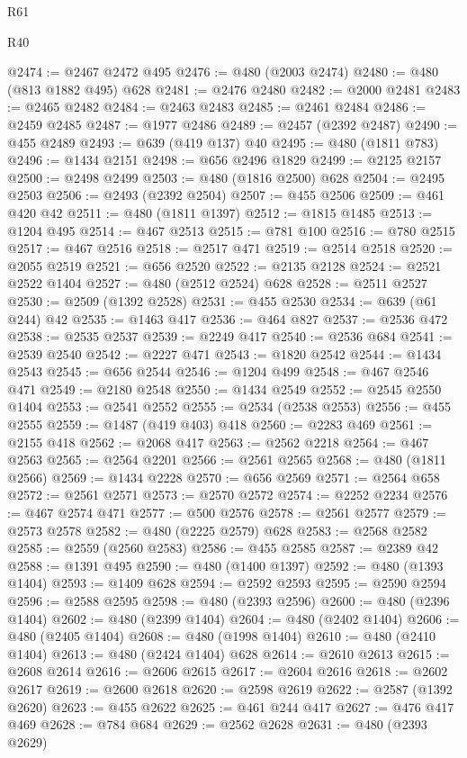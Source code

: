 \begin{lexlean}{R61}
\begin{lexlean}{R40}
\begin{coremodule}
{{{{{{{{{{{{{{{{{{{{{{{{{{{{{{{{{{{{{{{{{{{{{{{{{{{{{{{{{{{{{{{{{{{{{{{{{{{{{{{{{{{{{{{{{{{{{{{{{{{{{{{{{{{{{@2474 := @2467 @2472 @495
@2476 := @480 (@2003 @2474)
@2480 := @480 (@813 @1882 @495) @628
@2481 := @2476 @2480
@2482 := @2000 @2481
@2483 := @2465 @2482
@2484 := @2463 @2483
@2485 := @2461 @2484
@2486 := @2459 @2485
@2487 := @1977 @2486
@2489 := @2457 (@2392 @2487)
@2490 := @455 @2489
@2493 := @639 (@419 @137) @40
@2495 := @480 (@1811 @783)
@2496 := @1434 @2151
@2498 := @656 @2496 @1829
@2499 := @2125 @2157
@2500 := @2498 @2499
@2503 := @480 (@1816 @2500) @628
@2504 := @2495 @2503
@2506 := @2493 (@2392 @2504)
@2507 := @455 @2506
@2509 := @461 @420 @42
@2511 := @480 (@1811 @1397)
@2512 := @1815 @1485
@2513 := @1204 @495
@2514 := @467 @2513
@2515 := @781 @100
@2516 := @780 @2515
@2517 := @467 @2516
@2518 := @2517 @471
@2519 := @2514 @2518
@2520 := @2055 @2519
@2521 := @656 @2520
@2522 := @2135 @2128
@2524 := @2521 @2522 @1404
@2527 := @480 (@2512 @2524) @628
@2528 := @2511 @2527
@2530 := @2509 (@1392 @2528)
@2531 := @455 @2530
@2534 := @639 (@61 @244) @42
@2535 := @1463 @417
@2536 := @464 @827
@2537 := @2536 @472
@2538 := @2535 @2537
@2539 := @2249 @417
@2540 := @2536 @684
@2541 := @2539 @2540
@2542 := @2227 @471
@2543 := @1820 @2542
@2544 := @1434 @2543
@2545 := @656 @2544
@2546 := @1204 @499
@2548 := @467 @2546 @471
@2549 := @2180 @2548
@2550 := @1434 @2549
@2552 := @2545 @2550 @1404
@2553 := @2541 @2552
@2555 := @2534 (@2538 @2553)
@2556 := @455 @2555
@2559 := @1487 (@419 @403) @418
@2560 := @2283 @469
@2561 := @2155 @418
@2562 := @2068 @417
@2563 := @2562 @2218
@2564 := @467 @2563
@2565 := @2564 @2201
@2566 := @2561 @2565
@2568 := @480 (@1811 @2566)
@2569 := @1434 @2228
@2570 := @656 @2569
@2571 := @2564 @658
@2572 := @2561 @2571
@2573 := @2570 @2572
@2574 := @2252 @2234
@2576 := @467 @2574 @471
@2577 := @500 @2576
@2578 := @2561 @2577
@2579 := @2573 @2578
@2582 := @480 (@2225 @2579) @628
@2583 := @2568 @2582
@2585 := @2559 (@2560 @2583)
@2586 := @455 @2585
@2587 := @2389 @42
@2588 := @1391 @495
@2590 := @480 (@1400 @1397)
@2592 := @480 (@1393 @1404)
@2593 := @1409 @628
@2594 := @2592 @2593
@2595 := @2590 @2594
@2596 := @2588 @2595
@2598 := @480 (@2393 @2596)
@2600 := @480 (@2396 @1404)
@2602 := @480 (@2399 @1404)
@2604 := @480 (@2402 @1404)
@2606 := @480 (@2405 @1404)
@2608 := @480 (@1998 @1404)
@2610 := @480 (@2410 @1404)
@2613 := @480 (@2424 @1404) @628
@2614 := @2610 @2613
@2615 := @2608 @2614
@2616 := @2606 @2615
@2617 := @2604 @2616
@2618 := @2602 @2617
@2619 := @2600 @2618
@2620 := @2598 @2619
@2622 := @2587 (@1392 @2620)
@2623 := @455 @2622
@2625 := @461 @244 @417
@2627 := @476 @417 @469
@2628 := @784 @684
@2629 := @2562 @2628
@2631 := @480 (@2393 @2629)
}}}}}}}}}}}}}}}}}}}}}}}}}}}}}}}}}}}}}}}}}}}}}}}}}}}}}}}}}}}}}}}}}}}}}}}}}}}}}}}}}}}}}}}}}}}}}}}}}}}}}}}}}}}}}
\end{coremodule}
\end{lexlean}
\end{lexlean}
